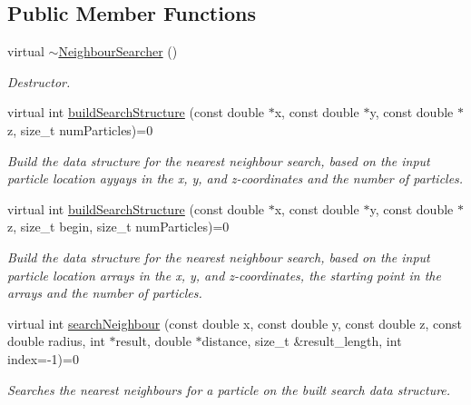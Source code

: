 \subsection*{Public Member Functions}
\begin{DoxyCompactItemize}
\item 
\hypertarget{classNeighbourSearcher_aa91ff4cc83209848f9318b82f73fe6d3}{virtual \hyperlink{classNeighbourSearcher_aa91ff4cc83209848f9318b82f73fe6d3}{$\sim$\-Neighbour\-Searcher} ()}\label{classNeighbourSearcher_aa91ff4cc83209848f9318b82f73fe6d3}

\begin{DoxyCompactList}\small\item\em Destructor. \end{DoxyCompactList}\item 
virtual int \hyperlink{classNeighbourSearcher_a8bc715cc108edbe1be3fcaacaef3958f}{build\-Search\-Structure} (const double $\ast$x, const double $\ast$y, const double $\ast$z, size\-\_\-t num\-Particles)=0
\begin{DoxyCompactList}\small\item\em Build the data structure for the nearest neighbour search, based on the input particle location ayyays in the x, y, and z-\/coordinates and the number of particles. \end{DoxyCompactList}\item 
virtual int \hyperlink{classNeighbourSearcher_a5268534d8a08622f66760202e12cbd07}{build\-Search\-Structure} (const double $\ast$x, const double $\ast$y, const double $\ast$z, size\-\_\-t begin, size\-\_\-t num\-Particles)=0
\begin{DoxyCompactList}\small\item\em Build the data structure for the nearest neighbour search, based on the input particle location arrays in the x, y, and z-\/coordinates, the starting point in the arrays and the number of particles. \end{DoxyCompactList}\item 
virtual int \hyperlink{classNeighbourSearcher_aeb7a7ca7e97680b159f1fc3f6e467764}{search\-Neighbour} (const double x, const double y, const double z, const double radius, int $\ast$result, double $\ast$distance, size\-\_\-t \&result\-\_\-length, int index=-\/1)=0
\begin{DoxyCompactList}\small\item\em Searches the nearest neighbours for a particle on the built search data structure. \end{DoxyCompactList}\end{DoxyCompactItemize}



